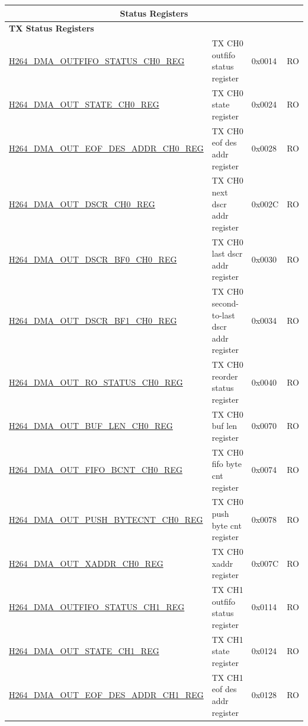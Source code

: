 \begin{longtable}{ | p{7.5cm} | p{5.7cm} | p{1.2cm} | p{1cm} | }
    \multicolumn{4}{|c|}{\cellcolor{gray!15}\textbf{Status Registers}} \\ \hline
    \multicolumn{4}{|l|}{\textbf{TX Status Registers}} \\ \hline
    \hyperref[regdesc:H264DMAOUTFIFOSTATUSCH0REG]{H264\_DMA\_OUTFIFO\_STATUS\_CH0\_REG} & TX CH0 outfifo status register & 0x0014 & RO \\ \hline
    \hyperref[regdesc:H264DMAOUTSTATECH0REG]{H264\_DMA\_OUT\_STATE\_CH0\_REG} & TX CH0 state register & 0x0024 & RO \\ \hline
    \hyperref[regdesc:H264DMAOUTEOFDESADDRCH0REG]{H264\_DMA\_OUT\_EOF\_DES\_ADDR\_CH0\_REG} & TX CH0 eof des addr register & 0x0028 & RO \\ \hline
    \hyperref[regdesc:H264DMAOUTDSCRCH0REG]{H264\_DMA\_OUT\_DSCR\_CH0\_REG} & TX CH0 next dscr addr register & 0x002C & RO \\ \hline
    \hyperref[regdesc:H264DMAOUTDSCRBF0CH0REG]{H264\_DMA\_OUT\_DSCR\_BF0\_CH0\_REG} & TX CH0 last dscr addr register & 0x0030 & RO \\ \hline
    \hyperref[regdesc:H264DMAOUTDSCRBF1CH0REG]{H264\_DMA\_OUT\_DSCR\_BF1\_CH0\_REG} & TX CH0 second-to-last dscr addr register & 0x0034 & RO \\ \hline
    \hyperref[regdesc:H264DMAOUTROSTATUSCH0REG]{H264\_DMA\_OUT\_RO\_STATUS\_CH0\_REG} & TX CH0 reorder status register & 0x0040 & RO \\ \hline
    \hyperref[regdesc:H264DMAOUTBUFLENCH0REG]{H264\_DMA\_OUT\_BUF\_LEN\_CH0\_REG} & TX CH0 buf len register & 0x0070 & RO \\ \hline
    \hyperref[regdesc:H264DMAOUTFIFOBCNTCH0REG]{H264\_DMA\_OUT\_FIFO\_BCNT\_CH0\_REG} & TX CH0 fifo byte cnt register & 0x0074 & RO \\ \hline
    \hyperref[regdesc:H264DMAOUTPUSHBYTECNTCH0REG]{H264\_DMA\_OUT\_PUSH\_BYTECNT\_CH0\_REG} & TX CH0 push byte cnt register & 0x0078 & RO \\ \hline
    \hyperref[regdesc:H264DMAOUTXADDRCH0REG]{H264\_DMA\_OUT\_XADDR\_CH0\_REG} & TX CH0 xaddr register & 0x007C & RO \\ \hline
    \hyperref[regdesc:H264DMAOUTFIFOSTATUSCH1REG]{H264\_DMA\_OUTFIFO\_STATUS\_CH1\_REG} & TX CH1 outfifo status register & 0x0114 & RO \\ \hline
    \hyperref[regdesc:H264DMAOUTSTATECH1REG]{H264\_DMA\_OUT\_STATE\_CH1\_REG} & TX CH1 state register & 0x0124 & RO \\ \hline
    \hyperref[regdesc:H264DMAOUTEOFDESADDRCH1REG]{H264\_DMA\_OUT\_EOF\_DES\_ADDR\_CH1\_REG} & TX CH1 eof des addr register & 0x0128 & RO \\ \hline

\end{longtable}
